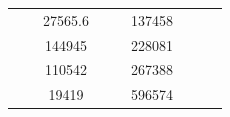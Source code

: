 \begin{table}[]
\begin{tabular}{|cccccclll}
\multicolumn{1}{|c|}{\cellcolor[HTML]{FFFFC7}}                                & \multicolumn{1}{c|}{\cellcolor[HTML]{DDFDFF}}                      & \multicolumn{1}{c|}{\cellcolor[HTML]{DAE8FC}27565.6}   & \multicolumn{1}{c|}{\cellcolor[HTML]{FFFFC7}}                                & \multicolumn{1}{c|}{\cellcolor[HTML]{DDFDFF}}                       & \multicolumn{1}{c|}{\cellcolor[HTML]{DDFDFF}137458}    &                                                                              &                                                                    &                                                        \\ \cline{3-3} \cline{6-6}
\multicolumn{1}{|c|}{\cellcolor[HTML]{FFFFC7}}                                & \multicolumn{1}{c|}{\cellcolor[HTML]{DDFDFF}}                      & \multicolumn{1}{c|}{\cellcolor[HTML]{DDFDFF}144945}    & \multicolumn{1}{c|}{\cellcolor[HTML]{FFFFC7}}                                & \multicolumn{1}{c|}{\cellcolor[HTML]{DDFDFF}}                       & \multicolumn{1}{c|}{\cellcolor[HTML]{DAE8FC}228081}    &                                                                              &                                                                    &                                                        \\ \cline{3-3} \cline{6-6}
\multicolumn{1}{|c|}{\cellcolor[HTML]{FFFFC7}}                                & \multicolumn{1}{c|}{\cellcolor[HTML]{DDFDFF}}                      & \multicolumn{1}{c|}{\cellcolor[HTML]{DAE8FC}110542}    & \multicolumn{1}{c|}{\cellcolor[HTML]{FFFFC7}}                                & \multicolumn{1}{c|}{\cellcolor[HTML]{DDFDFF}}                       & \multicolumn{1}{c|}{\cellcolor[HTML]{DDFDFF}267388}    &                                                                              &                                                                    &                                                        \\ \cline{3-3} \cline{6-6}
\multicolumn{1}{|c|}{\cellcolor[HTML]{FFFFC7}}                                & \multicolumn{1}{c|}{\cellcolor[HTML]{DDFDFF}}                      & \multicolumn{1}{c|}{\cellcolor[HTML]{DDFDFF}19419}     & \multicolumn{1}{c|}{\cellcolor[HTML]{FFFFC7}}                                & \multicolumn{1}{c|}{\cellcolor[HTML]{DDFDFF}}                       & \multicolumn{1}{c|}{\cellcolor[HTML]{DAE8FC}596574}    &                                                                              &                                                                    &                                                        \\ \cline{3-3} \cline{6-6}

\end{tabular}
\end{table}
